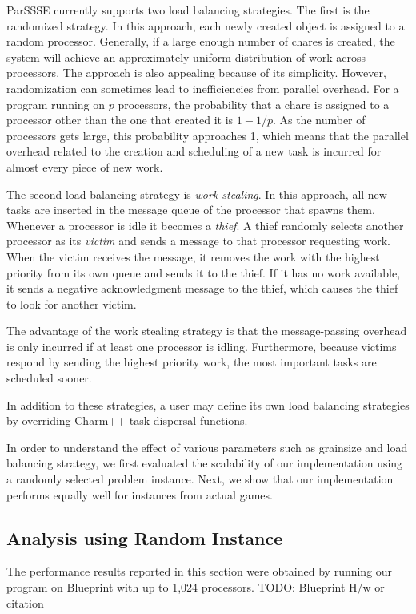 \documentclass[times, 10pt,twocolumn]{article}
\begin{document}
{\sc ParSSSE} currently supports two load balancing strategies.  The
first is the randomized strategy.  In this approach, each newly created object
is assigned to a random processor.  Generally, if a large enough number of 
chares is created, the system will achieve an approximately uniform
distribution of work across processors.  The approach is also appealing because
of its simplicity. However, randomization can sometimes lead to inefficiencies
from parallel overhead.  For a program running on $p$ processors, the
probability that a chare is assigned to a processor other than the
one that created it is $1-1/p$.  As the number of processors gets large, this
probability approaches 1, which means that the parallel overhead related to the
creation and scheduling of a new task is incurred for almost every piece of new
work.
 
The second load balancing strategy is {\em work stealing}.  In this
approach, all new tasks are inserted in the message queue of the processor that
spawns them.  Whenever a processor is idle it becomes a {\em thief}.  A thief
randomly selects another processor as its {\em victim} and sends a message to
that processor requesting work.  When the victim receives the message, it
removes the work with the highest priority from its own queue and sends it to
the thief.  If it has no work available, it sends a negative acknowledgment
message to the thief, which causes the thief to look for another victim.

The advantage of the work stealing strategy is that the message-passing
overhead is only incurred if at least one processor is idling.  Furthermore,
because victims respond by sending the highest priority work, the most
important tasks are scheduled sooner.  

In addition to these strategies, a user may define its own load balancing
strategies by overriding {\sc Charm++} task dispersal functions.


\label{Results}
In order to understand the effect of various parameters such as grainsize and
load balancing strategy, we first evaluated the scalability of our
implementation using a randomly selected problem instance. Next, we show that
our implementation performs equally well for instances from actual games.

\subsection{Analysis using Random Instance} 
The performance results reported in this section were obtained by running our
program on Blueprint with up to 1,024 processors. TODO: Blueprint H/w or
citation
\end{document}
